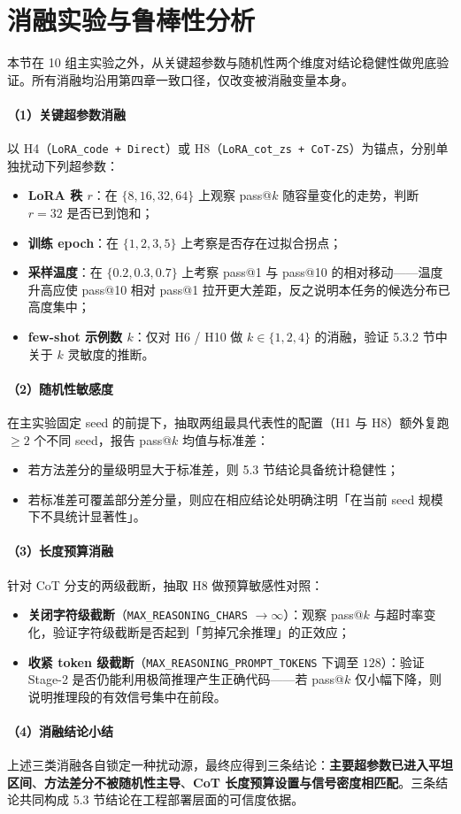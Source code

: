 \section{消融实验与鲁棒性分析}

本节在 10 组主实验之外，从关键超参数与随机性两个维度对结论稳健性做兜底验证。所有消融均沿用第四章一致口径，仅改变被消融变量本身。

\paragraph{（1）关键超参数消融}
以 H4（\texttt{LoRA\_code + Direct}）或 H8（\texttt{LoRA\_cot\_zs + CoT-ZS}）为锚点，分别单独扰动下列超参数：
\begin{itemize}
    \item \textbf{LoRA 秩 $r$}：在 $\{8, 16, 32, 64\}$ 上观察 pass@$k$ 随容量变化的走势，判断 $r{=}32$ 是否已到饱和；
    \item \textbf{训练 epoch}：在 $\{1, 2, 3, 5\}$ 上考察是否存在过拟合拐点；
    \item \textbf{采样温度}：在 $\{0.2, 0.3, 0.7\}$ 上考察 pass@1 与 pass@10 的相对移动——温度升高应使 pass@10 相对 pass@1 拉开更大差距，反之说明本任务的候选分布已高度集中；
    \item \textbf{few-shot 示例数 $k$}：仅对 H6 / H10 做 $k \in \{1, 2, 4\}$ 的消融，验证 5.3.2 节中关于 $k$ 灵敏度的推断。
\end{itemize}

\paragraph{（2）随机性敏感度}
在主实验固定 seed 的前提下，抽取两组最具代表性的配置（H1 与 H8）额外复跑 $\ge 2$ 个不同 seed，报告 pass@$k$ 均值与标准差：
\begin{itemize}
    \item 若方法差分的量级明显大于标准差，则 5.3 节结论具备统计稳健性；
    \item 若标准差可覆盖部分差分量，则应在相应结论处明确注明「在当前 seed 规模下不具统计显著性」。
\end{itemize}

\paragraph{（3）长度预算消融}
针对 CoT 分支的两级截断，抽取 H8 做预算敏感性对照：
\begin{itemize}
    \item \textbf{关闭字符级截断}（\texttt{MAX\_REASONING\_CHARS} $\to \infty$）：观察 pass@$k$ 与超时率变化，验证字符级截断是否起到「剪掉冗余推理」的正效应；
    \item \textbf{收紧 token 级截断}（\texttt{MAX\_REASONING\_PROMPT\_TOKENS} 下调至 $128$）：验证 Stage-2 是否仍能利用极简推理产生正确代码——若 pass@$k$ 仅小幅下降，则说明推理段的有效信号集中在前段。
\end{itemize}

\paragraph{（4）消融结论小结}
上述三类消融各自锁定一种扰动源，最终应得到三条结论：\textbf{主要超参数已进入平坦区间}、\textbf{方法差分不被随机性主导}、\textbf{CoT 长度预算设置与信号密度相匹配}。三条结论共同构成 5.3 节结论在工程部署层面的可信度依据。
